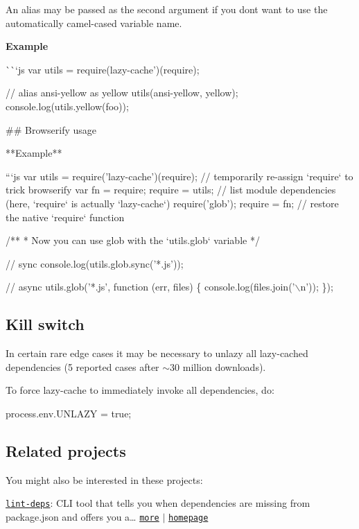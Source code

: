 An alias may be passed as the second argument if you don\textquotesingle{}t want to use the automatically camel-\/cased variable name.

{\bfseries Example}

\`{}\`{}`js var utils = require(\textquotesingle{}lazy-\/cache')(require);

// alias {\ttfamily ansi-\/yellow} as {\ttfamily yellow} utils(\textquotesingle{}ansi-\/yellow\textquotesingle{}, \textquotesingle{}yellow\textquotesingle{}); console.\+log(utils.\+yellow(\textquotesingle{}foo\textquotesingle{})); 
\begin{DoxyCode}
## Browserify usage

**Example**

```js
var utils = require('lazy-cache')(require);
// temporarily re-assign `require` to trick browserify
var fn = require;
require = utils;
// list module dependencies (here, `require` is actually `lazy-cache`)
require('glob');
require = fn; // restore the native `require` function

/**
 * Now you can use glob with the `utils.glob` variable
 */

// sync
console.log(utils.glob.sync('*.js'));

// async
utils.glob('*.js', function (err, files) \{
  console.log(files.join('\(\backslash\)n'));
\});
\end{DoxyCode}


\subsection*{Kill switch}

In certain rare edge cases it may be necessary to unlazy all lazy-\/cached dependencies (5 reported cases after $\sim$30 million downloads).

To force lazy-\/cache to immediately invoke all dependencies, do\+:


\begin{DoxyCode}
process.env.UNLAZY = true;
\end{DoxyCode}


\subsection*{Related projects}

You might also be interested in these projects\+:

\href{https://www.npmjs.com/package/lint-deps}{\tt lint-\/deps}\+: C\+LI tool that tells you when dependencies are missing from package.\+json and offers you a… \href{https://www.npmjs.com/package/lint-deps}{\tt more} $\vert$ \href{https://github.com/jonschlinkert/lint-deps}{\tt homepage}

